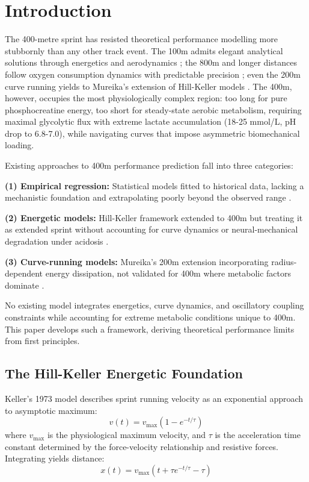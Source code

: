 \documentclass[12pt,a4paper]{article}
\begin{document}
\section{Introduction}

The 400-metre sprint has resisted theoretical performance modelling more stubbornly than any other track event. The 100m admits elegant analytical solutions through energetics and aerodynamics \citep{Keller1973, Pritchard2008}; the 800m and longer distances follow oxygen consumption dynamics with predictable precision \citep{diPrampero1986, Jones2010}; even the 200m curve running yields to Mureika's extension of Hill-Keller models \citep{Mureika1997}. The 400m, however, occupies the most physiologically complex region: too long for pure phosphocreatine energy, too short for steady-state aerobic metabolism, requiring maximal glycolytic flux with extreme lactate accumulation (18-25 mmol/L, pH drop to 6.8-7.0), while navigating curves that impose asymmetric biomechanical loading.

Existing approaches to 400m performance prediction fall into three categories:

\textbf{(1) Empirical regression:} Statistical models fitted to historical data, lacking a mechanistic foundation and extrapolating poorly beyond the observed range \citep{Nevill2005}.

\textbf{(2) Energetic models:} Hill-Keller framework extended to 400m but treating it as extended sprint without accounting for curve dynamics or neural-mechanical degradation under acidosis \citep{Behncke1993, Ward-Smith1999}.

\textbf{(3) Curve-running models:} Mureika's 200m extension incorporating radius-dependent energy dissipation, not validated for 400m where metabolic factors dominate \citep{Mureika1997, Quinn2009}.

No existing model integrates energetics, curve dynamics, and oscillatory coupling constraints while accounting for extreme metabolic conditions unique to 400m. This paper develops such a framework, deriving theoretical performance limits from first principles.

\subsection{The Hill-Keller Energetic Foundation}

Keller's 1973 model \citep{Keller1973} describes sprint running velocity as an exponential approach to asymptotic maximum:
\begin{equation}
v(t) = v_{\max} (1 - e^{-t/\tau})
\end{equation}
where $v_{\max}$ is the physiological maximum velocity, and $\tau$ is the acceleration time constant determined by the force-velocity relationship and resistive forces. Integrating yields distance:
\begin{equation}
x(t) = v_{\max} \left( t + \tau e^{-t/\tau} - \tau \right)
\end{equation}
\end{document}
